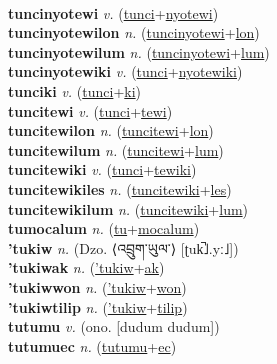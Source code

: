  \label{tuncinu} \\
\textbf{tuncinyotewi} \textit{v.} (\hyperref[tunci]{tunci}+\hyperref[nyotewi]{nyotewi})
 \label{tuncinyotewi} \\
\textbf{tuncinyotewilon} \textit{n.} (\hyperref[tuncinyotewi]{tuncinyotewi}+\hyperref[lon]{lon})
 \label{tuncinyotewilon} \\
\textbf{tuncinyotewilum} \textit{n.} (\hyperref[tuncinyotewi]{tuncinyotewi}+\hyperref[lum]{lum})
 \label{tuncinyotewilum} \\
\textbf{tuncinyotewiki} \textit{v.} (\hyperref[tunci]{tunci}+\hyperref[nyotewiki]{nyotewiki})
 \label{tuncinyotewiki} \\
\textbf{tunciki} \textit{v.} (\hyperref[tunci]{tunci}+\hyperref[ki]{ki})
 \label{tunciki} \\
\textbf{tuncitewi} \textit{v.} (\hyperref[tunci]{tunci}+\hyperref[tewi]{tewi})
 \label{tuncitewi} \\
\textbf{tuncitewilon} \textit{n.} (\hyperref[tuncitewi]{tuncitewi}+\hyperref[lon]{lon})
 \label{tuncitewilon} \\
\textbf{tuncitewilum} \textit{n.} (\hyperref[tuncitewi]{tuncitewi}+\hyperref[lum]{lum})
 \label{tuncitewilum} \\
\textbf{tuncitewiki} \textit{v.} (\hyperref[tunci]{tunci}+\hyperref[tewiki]{tewiki})
 \label{tuncitewiki} \\
\textbf{tuncitewikiles} \textit{n.} (\hyperref[tuncitewiki]{tuncitewiki}+\hyperref[les]{les})
 \label{tuncitewikiles} \\
\textbf{tuncitewikilum} \textit{n.} (\hyperref[tuncitewiki]{tuncitewiki}+\hyperref[lum]{lum})
 \label{tuncitewikilum} \\
\textbf{tumocalum} \textit{n.} (\hyperref[tu]{tu}+\hyperref[mocalum]{mocalum})
 \label{tumocalum} \\
\textbf{'tukiw} \textit{n.} (Dzo. ⟨འབྲུག་ཡུལ་⟩ [ʈuk̚˩.yː˩])
 \label{'tukiw} \\
\textbf{'tukiwak} \textit{n.} (\hyperref['tukiw]{'tukiw}+\hyperref[ak]{ak})
 \label{'tukiwak} \\
\textbf{'tukiwwon} \textit{n.} (\hyperref['tukiw]{'tukiw}+\hyperref[won]{won})
 \label{'tukiwwon} \\
\textbf{'tukiwtilip} \textit{n.} (\hyperref['tukiw]{'tukiw}+\hyperref[tilip]{tilip})
 \label{'tukiwtilip} \\
\textbf{tutumu} \textit{v.} (ono. [dudum dudum])
 \label{tutumu} \\
\textbf{tutumuec} \textit{n.} (\hyperref[tutumu]{tutumu}+\hyperref[ec]{ec})

